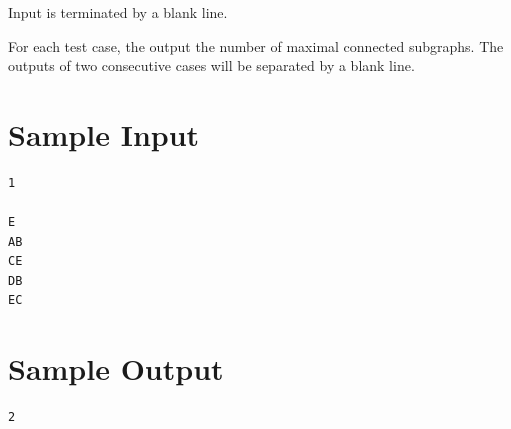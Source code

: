 \documentclass{article}
\begin{document}
Input is terminated by a blank line.

For each test case, the output the number of maximal connected subgraphs. The outputs of two consecutive cases will be separated by a blank line.

\section*{Sample Input}
\begin{verbatim}
1

E
AB
CE
DB
EC
\end{verbatim}
\section*{Sample Output}
\begin{verbatim}
2
\end{verbatim}
\end{document}
